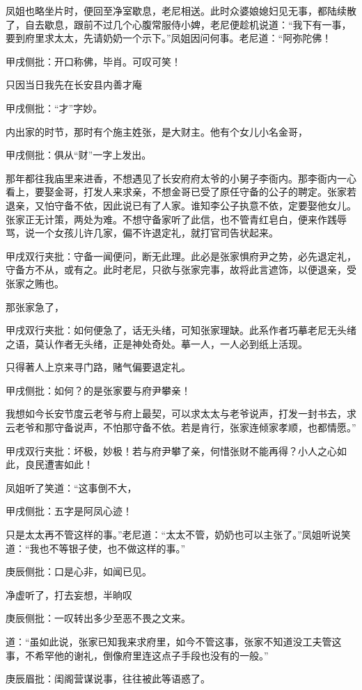 \begin{parag}
    凤姐也略坐片时，便回至净室歇息，老尼相送。此时众婆娘媳妇见无事，都陆续散了，自去歇息，跟前不过几个心腹常服侍小婢，老尼便趁机说道：“我下有一事，要到府里求太太，先请奶奶一个示下。”凤姐因问何事。老尼道：“阿弥陀佛！\begin{note}甲戌侧批：开口称佛，毕肖。可叹可笑！\end{note}只因当日我先在长安县内善才庵\begin{note}甲戌侧批：“才”字妙。\end{note}内出家的时节，那时有个施主姓张，是大财主。他有个女儿小名金哥，\begin{note}甲戌侧批：俱从“财”一字上发出。\end{note}那年都往我庙里来进香，不想遇见了长安府府太爷的小舅子李衙内。那李衙内一心看上，要娶金哥，打发人来求亲，不想金哥已受了原任守备的公子的聘定。张家若退亲，又怕守备不依，因此说已有了人家。谁知李公子执意不依，定要娶他女儿。张家正无计策，两处为难。不想守备家听了此信，也不管青红皂白，便来作践辱骂，说一个女孩儿许几家，偏不许退定礼，就打官司告状起来。\begin{note}甲戌双行夹批：守备一闻便问，断无此理。此必是张家惧府尹之势，必先退定礼，守备方不从，或有之。此时老尼，只欲与张家完事，故将此言遮饰，以便退亲，受张家之贿也。\end{note}那张家急了，\begin{note}甲戌双行夹批：如何便急了，话无头绪，可知张家理缺。此系作者巧摹老尼无头绪之语，莫认作者无头绪，正是神处奇处。摹一人，一人必到纸上活现。\end{note}只得著人上京来寻门路，赌气偏要退定礼。\begin{note}甲戌侧批：如何？的是张家要与府尹攀亲！\end{note}我想如今长安节度云老爷与府上最契，可以求太太与老爷说声，打发一封书去，求云老爷和那守备说声，不怕那守备不依。若是肯行，张家连倾家孝顺，也都情愿。”\begin{note}甲戌双行夹批：坏极，妙极！若与府尹攀了亲，何惜张财不能再得？小人之心如此，良民遭害如此！\end{note}
\end{parag}


\begin{parag}
    凤姐听了笑道：“这事倒不大，\begin{note}甲戌侧批：五字是阿凤心迹！\end{note}只是太太再不管这样的事。”老尼道：“太太不管，奶奶也可以主张了。”凤姐听说笑道：“我也不等银子使，也不做这样的事。”\begin{note}庚辰侧批：口是心非，如闻已见。\end{note}净虚听了，打去妄想，半晌叹\begin{note}庚辰侧批：一叹转出多少至恶不畏之文来。\end{note}道：“虽如此说，张家已知我来求府里，如今不管这事，张家不知道没工夫管这事，不希罕他的谢礼，倒像府里连这点子手段也没有的一般。”\begin{note}庚辰眉批：闺阁营谋说事，往往被此等语惑了。\end{note}
\end{parag}


